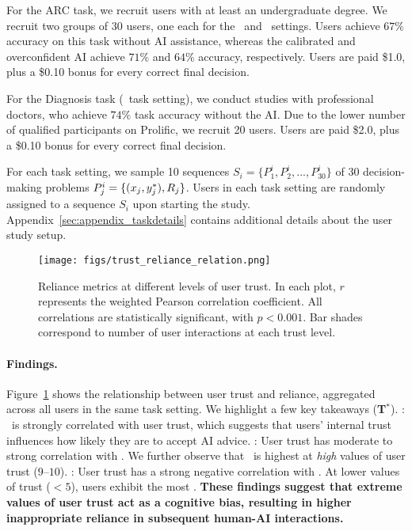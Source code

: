 For the ARC task, we recruit users with at least an undergraduate degree. 
We recruit two groups of 30 users, one each for the \arcc\ and \arco\ settings. 
Users achieve $67\%$ accuracy on this task without AI assistance, whereas the calibrated and overconfident AI achieve $71\%$ and $64\%$ accuracy, respectively. 
Users are paid \$1.0, plus a \$0.10 bonus for every correct final decision. 

For the Diagnosis task (\diagc\ task setting), we conduct studies with professional doctors, who achieve $74\%$ task accuracy without the AI. 
Due to the lower number of qualified participants on Prolific, we recruit 20 users. 
Users are paid \$2.0, plus a \$0.10 bonus for every correct final decision.

For each task setting, we sample 10 sequences $S_i = \{ P^i_1, P^i_2, ..., P^i_{30}\}$ of 30 decision-making problems $P^i_j = \{ (x_j, y^*_j), R_j \}$.
Users in each task setting are randomly assigned to a sequence $S_i$ upon starting the study. 
Appendix~\ref{sec:appendix_taskdetails} contains additional details about the user study setup.

\begin{figure}[t]
    \centering
    \texttt{[image: figs/trust\_reliance\_relation.png]}
    \caption{Reliance metrics at different levels of user trust. In each plot, $r$ represents the weighted Pearson correlation coefficient. All correlations are statistically significant, with $p < 0.001$. Bar shades correspond to number of user interactions at each trust level. }
    \label{fig:initial_reliance_plots}
\end{figure}

\paragraph{Findings.} 
Figure~\ref{fig:initial_reliance_plots} shows the relationship between user trust and reliance, aggregated across all users in the same task setting. 
We highlight a few key takeaways (\textbf{T$^*$}). 
: \switchrate\ is strongly correlated with user trust, which suggests that users' internal trust influences how likely they are to accept AI advice. 
: User trust has moderate to strong correlation with \overreliance. We further observe that \overreliance\ is highest at \emph{high} values of user trust ($9$--$10$). 
: User trust has a strong negative correlation with \underreliance. At lower values of trust ($< 5$), users exhibit the most \underreliance.
\textbf{These findings suggest that extreme values of user trust act as a cognitive bias, resulting in higher inappropriate reliance in subsequent human-AI interactions.} 
